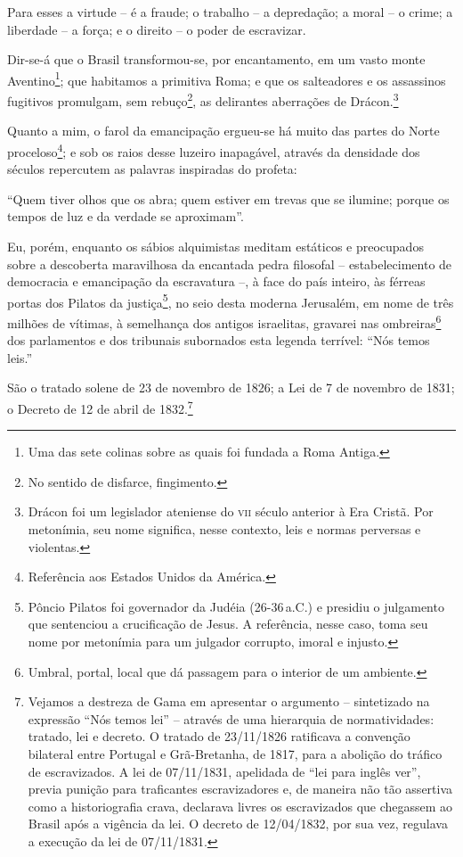 Para esses a virtude -- é a fraude; o trabalho -- a depredação; a moral
-- o crime; a liberdade -- a força; e o direito -- o poder de
escravizar.

Dir-se-á que o Brasil transformou-se, por encantamento, em um vasto
monte Aventino\footnote{Uma das sete colinas sobre as quais foi
  fundada a Roma Antiga.}; que habitamos a primitiva Roma; e que os
salteadores e os assassinos fugitivos promulgam, sem rebuço\footnote{
  No sentido de disfarce, fingimento.}, as delirantes aberrações de
Drácon.\footnote{Drácon foi um legislador ateniense do \textsc{vii} século
  anterior à Era Cristã. Por metonímia, seu nome significa, nesse
  contexto, leis e normas perversas e violentas.}

Quanto a mim, o farol da emancipação ergueu-se há muito das partes do
Norte proceloso\footnote{Referência aos Estados Unidos da América.}; e
sob os raios desse luzeiro inapagável, através da densidade dos séculos
repercutem as palavras inspiradas do profeta:

``Quem tiver olhos que os abra; quem estiver em trevas que se ilumine;
porque os tempos de luz e da verdade se aproximam''.

Eu, porém, enquanto os sábios alquimistas meditam estáticos e
preocupados sobre a descoberta maravilhosa da encantada pedra filosofal
-- estabelecimento de democracia e emancipação da escravatura --, à face
do país inteiro, às férreas portas dos Pilatos da justiça\footnote{
  Pôncio Pilatos foi governador da Judéia (26-36\,a.C.) e presidiu o
  julgamento que sentenciou a crucificação de Jesus. A referência, nesse
  caso, toma seu nome por metonímia para um julgador corrupto, imoral e
  injusto.}, no seio desta moderna Jerusalém, em nome de três milhões de
vítimas, à semelhança dos antigos israelitas, gravarei nas
ombreiras\footnote{Umbral, portal, local que dá passagem para o
  interior de um ambiente.} dos parlamentos e dos tribunais subornados
esta legenda terrível: ``Nós temos leis.''

São o tratado solene de 23 de novembro de 1826; a Lei de 7 de novembro
de 1831; o Decreto de 12 de abril de 1832.\footnote{Vejamos a destreza
  de Gama em apresentar o argumento -- sintetizado na expressão ``Nós
  temos lei'' -- através de uma hierarquia de normatividades: tratado,
  lei e decreto. O tratado de 23/11/1826 ratificava a convenção
  bilateral entre Portugal e Grã-Bretanha, de 1817, para a abolição do
  tráfico de escravizados. A lei de 07/11/1831, apelidada de ``lei para
  inglês ver'', previa punição para traficantes escravizadores e, de
  maneira não tão assertiva como a historiografia crava, declarava
  livres os escravizados que chegassem ao Brasil após a vigência da lei.
  O decreto de 12/04/1832, por sua vez, regulava a execução da lei de
  07/11/1831.}


